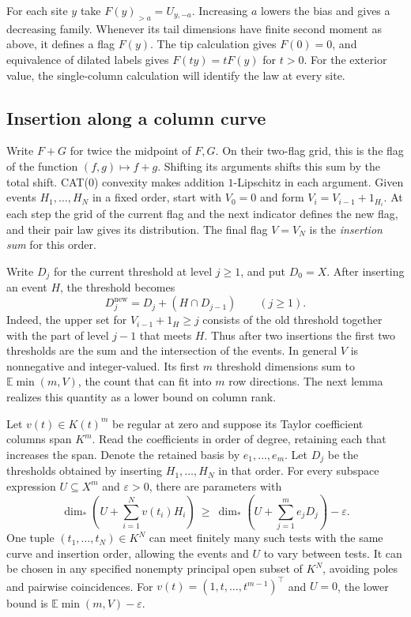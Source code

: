 For each site $y$ take $F(y)_{>a}=U_{y,-a}$. Increasing $a$ lowers
the bias and gives a decreasing family. Whenever its tail dimensions
have finite second moment as above, it defines a flag $F(y)$. The tip
calculation gives $F(0)=0$, and equivalence of dilated labels gives
$F(ty)=tF(y)$ for $t>0$. For the exterior value, the single-column
calculation will identify the law at every site.

\subsection{Insertion along a column curve}

Write $F+G$ for twice the midpoint of $F,G$. On their two-flag grid,
this is the flag of the function $(f,g)\mapsto f+g$. Shifting its
arguments shifts this sum by the total shift. CAT(0) convexity makes
addition $1$-Lipschitz in each argument. Given events $H_1,\ldots,H_N$
in a fixed order, start with $V_0=0$ and form
$V_i=V_{i-1}+1_{H_i}$. At each step the grid of the current flag and the next
indicator defines the new flag, and their pair law gives its
distribution. The final flag
$V=V_N$ is the \emph{insertion sum} for this order.

Write $D_j$ for the current threshold at level $j\ge1$, and put
$D_0=X$. After inserting an event $H$, the threshold becomes
\begin{equation}\label{flag:thresholdupdate}
 D_j^{\mathrm{new}}=D_j+(H\cap D_{j-1})\qquad (j\ge1).
\end{equation}
Indeed, the upper set for $V_{i-1}+1_H\ge j$ consists of the old
threshold together with the part of level $j-1$ that meets $H$. Thus
after two insertions the first two thresholds are the sum and the
intersection of the events. In general $V$ is nonnegative and
integer-valued. Its first $m$ threshold dimensions sum to
$\mathbb E\min(m,V)$, the count that can fit into $m$ row directions.
The next lemma realizes this quantity as a lower bound on column rank.

\begin{lemma}\label{flag:insertion}
Let $v(t)\in K(t)^m$ be regular at zero and suppose its Taylor
coefficient columns span $K^m$. Read the coefficients in order of
degree, retaining each that increases the span. Denote the retained
basis by $e_1,\ldots,e_m$. Let $D_j$ be the thresholds obtained by
inserting $H_1,\ldots,H_N$ in that order. For every subspace expression
$U\subseteq X^m$ and $\varepsilon>0$, there are parameters with
\[
 \dim_*\!\left(U+\sum_{i=1}^N v(t_i)H_i\right)
 \ \ge\ \dim_*\!\left(U+\sum_{j=1}^m e_jD_j\right)-\varepsilon .
\]
One tuple $(t_1,\ldots,t_N)\in K^N$ can meet finitely many such tests
with the same curve and insertion order, allowing the events and $U$
to vary between tests. It can be chosen in any specified nonempty
principal open subset of $K^N$, avoiding poles and pairwise
coincidences. For $v(t)=(1,t,\ldots,t^{m-1})^\top$ and $U=0$, the
lower bound is $\mathbb E\min(m,V)-\varepsilon$.
\end{lemma}


